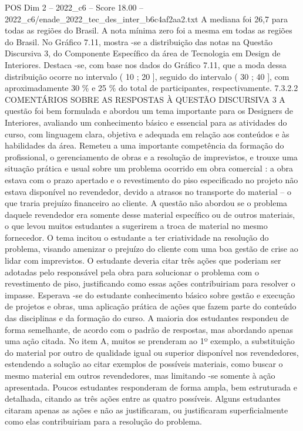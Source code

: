 \begin{textsample}{POS Dim 2 – 2022\_c6 – Score 18.00 – 2022\_c6/enade\_2022\_tec\_des\_inter\_b6c4af2aa2.txt}
A mediana foi 26,7 para todas as regiões do Brasil.
A nota mínima zero foi a mesma em todas as regiões do Brasil.
No Gráfico 7.11, mostra -se a distribuição das notas na Questão Discursiva 3, do Componente Específico da área de Tecnologia em Design de Interiores.
Destaca -se, com base nos dados do Gráfico 7.11, que a moda dessa distribuição ocorre no intervalo ( 10 ; 20 ], seguido do intervalo ( 30 ; 40 ], com aproximadamente 30 \% e 25 \% do total de participantes, respectivamente. 7.3.2.2 COMENTÁRIOS SOBRE AS RESPOSTAS À QUESTÃO DISCURSIVA 3 A questão foi bem formulada e abordou um tema importante para os Designers de Interiores, avaliando um conhecimento básico e essencial para as atividades do curso, com linguagem clara, objetiva e adequada em relação aos conteúdos e às habilidades da área.
Remeteu a uma importante competência da formação do profissional, o gerenciamento de obras e a resolução de imprevistos, e trouxe uma situação prática e usual sobre um problema ocorrido em obra comercial : a obra estava com o prazo apertado e o revestimento do piso especificado no projeto não estava disponível no revendedor, devido a atrasos no transporte do material – o que traria prejuízo financeiro ao cliente.
A questão não abordou se o problema daquele revendedor era somente desse material específico ou de outros materiais, o que levou muitos estudantes a sugerirem a troca de material no mesmo fornecedor.
O tema incitou o estudante a ter criatividade na resolução do problema, visando amenizar o prejuízo do cliente com uma boa gestão de crise ao lidar com imprevistos.
O estudante deveria citar três ações que poderiam ser adotadas pelo responsável pela obra para solucionar o problema com o revestimento de piso, justificando como essas ações contribuiriam para resolver o impasse.
Esperava -se do estudante conhecimento básico sobre gestão e execução de projetos e obras, uma aplicação prática de ações que fazem parte do conteúdo das disciplinas e da formação do curso.
A maioria dos estudantes respondeu de forma semelhante, de acordo com o padrão de respostas, mas abordando apenas uma ação citada.
No item A, muitos se prenderam ao 1º exemplo, a substituição do material por outro de qualidade igual ou superior disponível nos revendedores, estendendo a solução ao citar exemplos de possíveis materiais, como buscar o mesmo material em outros revendedores, mas limitando -se somente à ação apresentada.
Poucos estudantes responderam de forma ampla, bem estruturada e detalhada, citando as três ações entre as quatro possíveis.
Alguns estudantes citaram apenas as ações e não as justificaram, ou justificaram superficialmente como elas contribuiriam para a resolução do problema.

\end{textsample}

